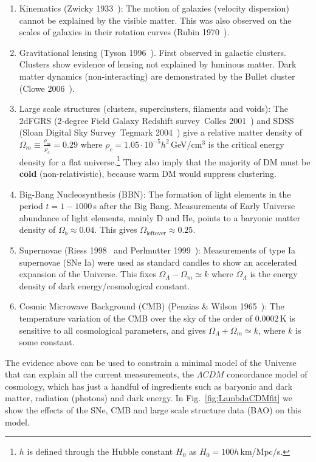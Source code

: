\documentclass[notes.tex]{subfiles}
\begin{document}
\begin{enumerate}[1)]
\item Kinematics  (Zwicky 1933~\cite{Zwicky:1933gu}): The motion of galaxies (velocity dispersion) cannot be explained by the visible matter. This was also observed on the scales of galaxies in their rotation curves (Rubin 1970~\cite{Rubin:1970zz}).
\item Gravitational lensing (Tyson 1996~\cite{Fischer:1996eb}). First observed in galactic clusters. Clusters show evidence of lensing not explained by luminous matter.  Dark matter dynamics (non-interacting) are demonstrated by the Bullet cluster (Clowe 2006~\cite{Clowe:2006eq}). 
\item Large scale structures (clusters, superclusters, filaments and voids): The 2dFGRS (2-degree Field Galaxy Redshift survey~Colles 2001~\cite{Hawkins:2002sg}) and SDSS (Sloan Digital Sky Survey~Tegmark 2004~\cite{Abazajian:2004it}) give a relative matter density of $\Omega_m \equiv \frac{\rho_m}{\rho_c} = 0.29$ where $\rho_c = 1.05\cdot 10^{-5}h^2$\,GeV/cm$^3$ is the critical energy density for a flat universe.\footnote{$h$ is defined through the Hubble constant $H_0$ as $H_0=100 h$\,km/Mpc/s.} They also imply that the majority of DM must be {\bf cold} (non-relativistic), because warm DM would suppress clustering.
\item Big-Bang Nucleosynthesis (BBN): The formation of light elements in the period $t = 1-1000$\,s after the Big Bang. Measurements of Early Universe abundance of light elements, mainly D and He, points to a baryonic matter density of $\Omega_b \approx 0.04$. This gives $\Omega_{\text{leftover}} \approx 0.25$.
\item Supernovae (Riess 1998~\cite{Riess:1998cb} and Perlmutter 1999~\cite{Perlmutter:1999jt}): Measurements of type Ia supernovae (SNe Ia) were used as standard candles to show an accelerated expansion of the Universe. This fixes $\Omega_\Lambda-\Omega_m \simeq k$ where $\Omega_\Lambda$ is the energy density of dark energy/cosmological constant.
\item Cosmic Microwave Background (CMB) (Penzias \& Wilson 1965~\cite{Penzias:1965wn}): The temperature variation of the CMB over the sky of the order of $0.0002$\,K is sensitive to all cosmological parameters, and gives $\Omega_\Lambda +\Omega_m \simeq k$, where $k$ is some constant.
\end{enumerate}

The evidence above can be used to constrain a minimal model of the Universe that can explain all the current measurements, the $\Lambda CDM$ concordance model of cosmology, which has just a handful of ingredients such as baryonic and dark matter, radiation (photons) and dark energy.  In Fig.~\ref{fig:LambdaCDMfit} we show the effects of the SNe, CMB and large scale structure data (BAO) on this model.
\end{document}

